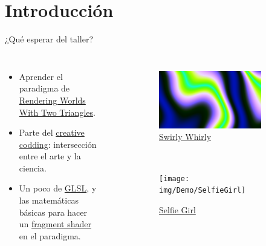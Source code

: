 \section{Introducción}
\begin{frame}{¿Qué esperar del taller?}
\begin{columns}
    \begin{itemize}
         \item Aprender el paradigma de \href{https://iquilezles.org/articles/nvscene2008/rwwtt.pdf}{Rendering Worlds With Two Triangles}.
         \item Parte del \href{https://www.smu.edu/meadows/newsandevents/news/2023/what-is-creative-coding}{creative codding}: intersección entre el arte y la ciencia.
         \item Un poco de \href{https://www.khronos.org/opengl/wiki/OpenGL_Shading_Language}{GLSL}, y las matemáticas básicas para hacer un \href{https://www.khronos.org/opengl/wiki/Portal:OpenGL_Shading_Language/Fragment_Shader}{fragment shader} en el paradigma.
     \end{itemize}
\begin{figure}[htp]
 \centering
 \begin{subfigure}[b]{0.42\textwidth}
   \includegraphics[width=\textwidth]{img/Demo/SwirlyWhirly}
   \caption{\href{https://www.shadertoy.com/view/X3dBRr}{Swirly Whirly}}
 \end{subfigure}
~
 \begin{subfigure}[b]{0.42\textwidth}
   \texttt{[image: img/Demo/SelfieGirl]}
   \caption{\href{https://www.shadertoy.com/view/WsSBzh}{Selfie Girl}}
 \end{subfigure}
\\
 \begin{subfigure}[b]{0.42\textwidth}

\end{subfigure}
\end{figure}
\end{columns}
\end{frame}
